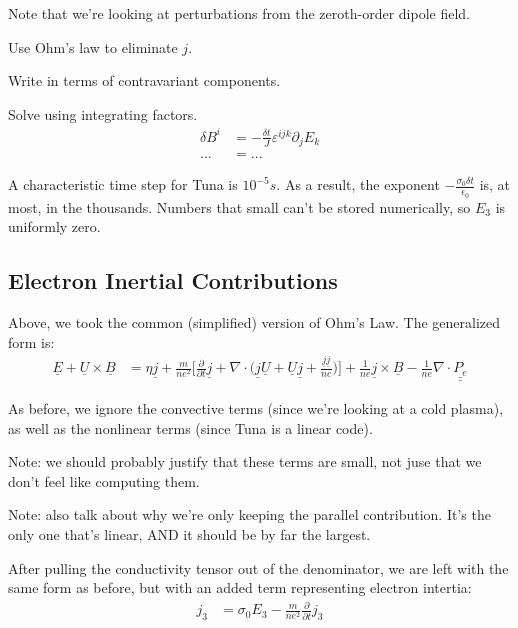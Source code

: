Note that we're looking at perturbations from the zeroth-order dipole field. 

Use Ohm's law to eliminate $j$. 

Write in terms of contravariant components. 

Solve using integrating factors. 
\begin{align}
  \delta B^i & = -\frac{\delta t}{J} \varepsilon^{ijk} \partial_j E_k \\
  ... & = ...
\end{align}

A characteristic time step for Tuna is $10^{-5} s$. As a result, the exponent $- \frac{\sigma_0 \delta t}{\epsilon_0}$ is, at most, in the thousands. Numbers that small can't be stored numerically, so $E_3$ is uniformly zero. 

\subsection{Electron Inertial Contributions}

Above, we took the common (simplified) version of Ohm's Law. The generalized form is:
\begin{align}
  \underline{E} +
  \underline{U} \times \underline{B} & = 
  \eta \underline{j} +
  \frac{m}{n e^2} \Big[
    \frac{\partial}{\partial t} \underline{j} +
    \nabla \cdot \big( \underline{j} \underline{U} +
    \underline{U} \underline{j} +
    \frac{ \underline{j} \underline{j} }{n e} \big) 
  \Big] +
  \frac{1}{n e} \underline{j} \times \underline{B} -
  \frac{1}{n e} \nabla \cdot \underline{ \underline{P_e} }
\end{align}

As before, we ignore the convective terms (since we're looking at a cold plasma), as well as the nonlinear terms (since Tuna is a linear code). 

Note: we should probably justify that these terms are small, not juse that we don't feel like computing them. 

Note: also talk about why we're only keeping the parallel contribution. It's the only one that's linear, AND it should be by far the largest. 

After pulling the conductivity tensor out of the denominator, we are left with the same form as before, but with an added term representing electron intertia:
\begin{align}
  j_3 & =
  \sigma_0 E_3 -
  \frac{m}{n e^2} \frac{\partial}{\partial t} j_3
\end{align}


